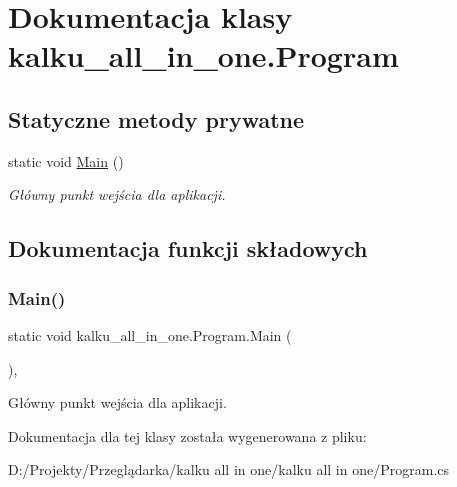 \hypertarget{classkalku__all__in__one_1_1_program}{}\section{Dokumentacja klasy kalku\+\_\+all\+\_\+in\+\_\+one.\+Program}
\label{classkalku__all__in__one_1_1_program}
\subsection*{Statyczne metody prywatne}
\begin{DoxyCompactItemize}
\item 
static void \mbox{\hyperlink{classkalku__all__in__one_1_1_program_a449585331fe3e2f477555a8d140d0cf2}{Main}} ()
\begin{DoxyCompactList}\small\item\em Główny punkt wejścia dla aplikacji. \end{DoxyCompactList}\end{DoxyCompactItemize}


\subsection{Dokumentacja funkcji składowych}
\mbox{\label{classkalku__all__in__one_1_1_program_a449585331fe3e2f477555a8d140d0cf2}} 
\subsubsection{\texorpdfstring{Main()}{Main()}}
{\footnotesize\ttfamily static void kalku\+\_\+all\+\_\+in\+\_\+one.\+Program.\+Main (\begin{DoxyParamCaption}{ }\end{DoxyParamCaption})\hspace{0.3cm}{\ttfamily [static]}, {\ttfamily [private]}}



Główny punkt wejścia dla aplikacji. 



Dokumentacja dla tej klasy została wygenerowana z pliku\+:\begin{DoxyCompactItemize}
\item 
D\+:/\+Projekty/\+Przeglądarka/kalku all in one/kalku all in one/Program.\+cs\end{DoxyCompactItemize}
